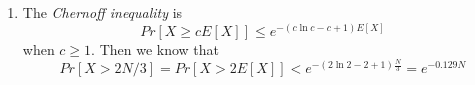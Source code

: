 \documentclass{article}
\begin{document}
\begin{enumerate}
			\item The \emph{Chernoff inequality} is \begin{equation}
				Pr\left[X \geq cE[X]\right] \leq e^{-(c \ln{c} - c + 1)E[X]}
			\end{equation} when $c \geq 1$.
			Then we know that \begin{equation}
				Pr\left[ X > 2N / 3\right] = Pr\left[X > 2E[X]\right] < e^{-(2\ln{2} - 2 + 1)\frac{N}{3}} = e^{-0.129N}
			\end{equation}

		\end{enumerate}
\end{document}
